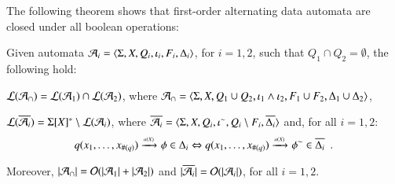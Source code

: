 \documentclass{llncs}
\begin{document}
The following theorem shows that first-order alternating data automata
are closed under all boolean operations: 

\begin{theorem}\label{thm:closure}
  Given automata $\mathcal{A}_i = \langle \Sigma,X,Q_i,\iota_i,F_i,\Delta_i \rangle$,
  for $i=1,2$, such that $Q_1 \cap Q_2 = \emptyset$, the following hold: 
  \begin{compactitem}
    \item\label{it1:closure} ${\mathcal L}({\mathcal{A}_\cap}) = {\mathcal L}({\mathcal{A}_1}) \cap {\mathcal L}({\mathcal{A}_2})$, where
      $\mathcal{A}_\cap = \langle \Sigma,X,Q_1 \cup Q_2, \iota_1 \wedge \iota_2,
      F_1 \cup F_2, \Delta_1 \cup \Delta_2 \rangle$, 
    \item\label{it2:closure} ${\mathcal L}({\overline{\mathcal{A}_i}}) = \Sigma[X]^* \setminus
      {\mathcal L}({\mathcal{A}_i})$, where $\overline{\mathcal{A}_i} =
      \langle \Sigma,X,Q_i,{\iota}^{\sim},Q_i\setminus
        F_i,\overline{\Delta_i} \rangle$ and, for all
      $i=1,2$: \[q(x_1,\ldots,x_{\#(q)}) \xrightarrow{{\scriptscriptstyle a(X)}}_{{\scriptstyle }} \phi \in
      \Delta_i \Leftrightarrow q(x_1,\ldots,x_{\#(q)}) \xrightarrow{{\scriptscriptstyle a(X)}}_{{\scriptstyle }} {\phi}^{\sim}
      \in \overline{\Delta_i} \enspace.\]
  \end{compactitem}
  Moreover, ${|{\mathcal{A}_\cap}|} = \mathcal{O}({{|{\mathcal{A}_1}|}+{|{\mathcal{A}_2}|}})$ and
  ${|{\overline{\mathcal{A}_i}}|} = \mathcal{O}({{|{\mathcal{A}_i}|}})$, for all $i=1,2$.
\end{theorem}
\proof{\qed}

 

\end{document}
